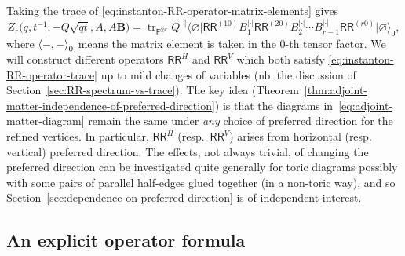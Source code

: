 \documentclass[10pt,a4paper]{amsart}
\numberwithin{equation}{section}
\renewcommand{\vec}[1]{\bm{#1}}
\newcommand{\sF}{\mathsf{F}}
\newcommand{\sRR}{\mathsf{RR}}
\DeclareMathOperator{\tr}{tr}
\DeclarePairedDelimiter{\inner}{\langle}{\rangle}
\begin{document}
\begin{MyParagraph}
Taking the trace of \eqref{eq:instanton-RR-operator-matrix-elements}
gives
\begin{equation} \label{eq:instanton-RR-operator-trace}
 Z_r\big(q,t^{-1}; -Q\sqrt{qt}, A, A\vec B\big) = \tr_{\sF^{\otimes r}} Q^{|\cdot|} \big\langle\varnothing \big| \sRR^{(10)} B_1^{|\cdot|} \sRR^{(20)} B_2^{|\cdot|} \cdots B_{r-1}^{|\cdot|} \sRR^{(r0)} \big| \varnothing\big\rangle_0,
\end{equation}
where $\inner*{-, -}_0$ means the matrix element is taken in the
$0$-th tensor factor. We will construct different operators $\sRR^H$
and $\sRR^V$ which both satisfy \eqref{eq:instanton-RR-operator-trace}
up to mild changes of variables (nb. the discussion of
Section~\ref{sec:RR-spectrum-vs-trace}). The key idea
(Theorem~\ref{thm:adjoint-matter-independence-of-preferred-direction})
is that the diagrams in~\eqref{eq:adjoint-matter-diagram} remain the
same under {\it any} choice of preferred direction for the refined
vertices. In particular, $\sRR^H$ (resp.~$\sRR^V$) arises from
horizontal (resp. vertical) preferred direction. The effects, not
always trivial, of changing the preferred direction can be
investigated quite generally for toric diagrams possibly with some
pairs of parallel half-edges glued together (in a non-toric way), and
so Section~\ref{sec:dependence-on-preferred-direction} is of independent interest.
\end{MyParagraph}

\subsection{An explicit operator formula}
\label{sec:explicit-operator-formula}
\end{document}
